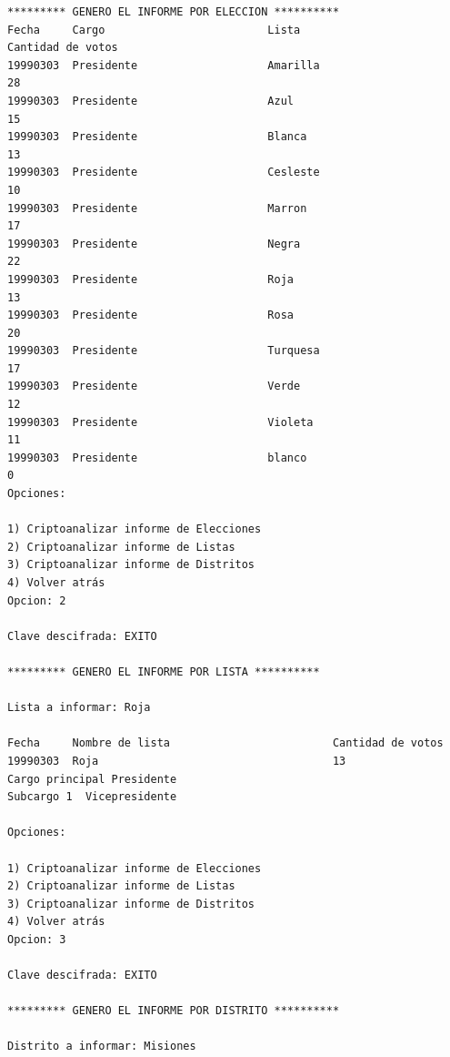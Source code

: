 \documentclass[a4paper,10pt]{article}
\begin{document}
\begin{verbatim}
********* GENERO EL INFORME POR ELECCION **********
Fecha     Cargo                         Lista                                   Cantidad de votos
19990303  Presidente                    Amarilla                                28             
19990303  Presidente                    Azul                                    15             
19990303  Presidente                    Blanca                                  13             
19990303  Presidente                    Cesleste                                10             
19990303  Presidente                    Marron                                  17             
19990303  Presidente                    Negra                                   22             
19990303  Presidente                    Roja                                    13             
19990303  Presidente                    Rosa                                    20             
19990303  Presidente                    Turquesa                                17             
19990303  Presidente                    Verde                                   12             
19990303  Presidente                    Violeta                                 11             
19990303  Presidente                    blanco                                  0              
Opciones: 

1) Criptoanalizar informe de Elecciones
2) Criptoanalizar informe de Listas
3) Criptoanalizar informe de Distritos
4) Volver atrás
Opcion: 2

Clave descifrada: EXITO

********* GENERO EL INFORME POR LISTA **********

Lista a informar: Roja

Fecha     Nombre de lista                         Cantidad de votos
19990303  Roja                                    13             
Cargo principal	Presidente
Subcargo 1	Vicepresidente

Opciones: 

1) Criptoanalizar informe de Elecciones
2) Criptoanalizar informe de Listas
3) Criptoanalizar informe de Distritos
4) Volver atrás
Opcion: 3

Clave descifrada: EXITO

********* GENERO EL INFORME POR DISTRITO **********

Distrito a informar: Misiones


\end{verbatim}
\end{document}
